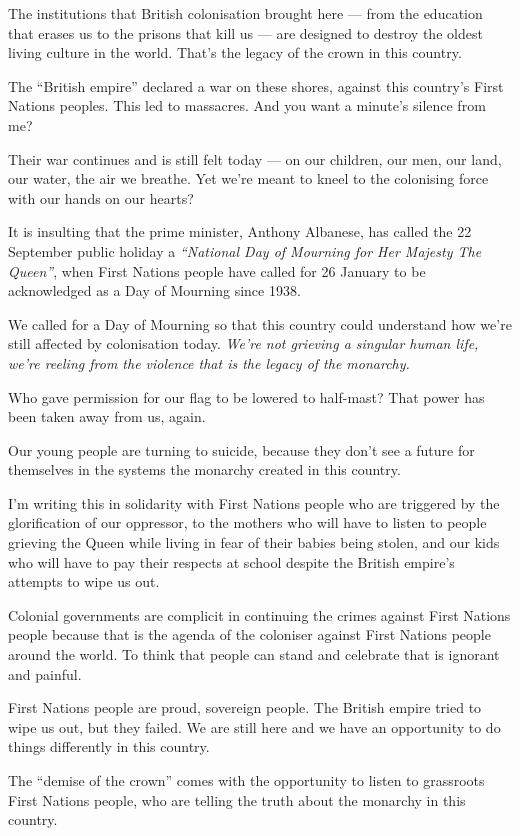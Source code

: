 \documentclass[a4paper]{article}
\begin{document}
The institutions that British colonisation brought here — from the education that erases us to the prisons that kill us — are designed to destroy the oldest living culture in the world. That’s the legacy of the crown in this country.

The ``British empire'' declared a war on these shores, against this country’s First Nations peoples. This led to massacres. And you want a minute’s silence from me?

Their war continues and is still felt today — on our children, our men, our land, our water, the air we breathe. Yet we’re meant to kneel to the colonising force with our hands on our hearts?

It is insulting that the prime minister, Anthony Albanese, has called the 22 September public holiday a \textit{``National Day of Mourning for Her Majesty The Queen''}, when First Nations people have called for 26 January to be acknowledged as a Day of Mourning since 1938.

We called for a Day of Mourning so that this country could understand how we’re still affected by colonisation today. \textit{We’re not grieving a singular human life, we’re reeling from the violence that is the legacy of the monarchy.}

Who gave permission for our flag to be lowered to half-mast? That power has been taken away from us, again.

Our young people are turning to suicide, because they don’t see a future for themselves in the systems the monarchy created in this country.

I’m writing this in solidarity with First Nations people who are triggered by the glorification of our oppressor, to the mothers who will have to listen to people grieving the Queen while living in fear of their babies being stolen, and our kids who will have to pay their respects at school despite the British empire’s attempts to wipe us out.

Colonial governments are complicit in continuing the crimes against First Nations people because that is the agenda of the coloniser against First Nations people around the world. To think that people can stand and celebrate that is ignorant and painful.

First Nations people are proud, sovereign people. The British empire tried to wipe us out, but they failed. We are still here and we have an opportunity to do things differently in this country.

The ``demise of the crown'' comes with the opportunity to listen to grassroots First Nations people, who are telling the truth about the monarchy in this country.
\end{document}
